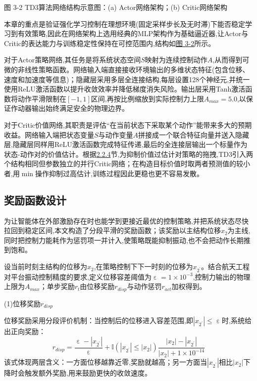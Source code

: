 \documentclass{scrbook}
\begin{document}
{{\par}{\centering 图 3-2 TD3算法网络结构示意图：(a) Actor网络架构；(b) Critic网络架构\label{ref-047}

\par}本章的重点是验证强化学习控制在理想环境(固定采样步长及无时滞)下能否稳定学习到有效策略,因此在网络架构上选用经典的MLP架构作为基础逼近器,让Actor与Critic的表达能力与训练稳定性保持在可控范围内,结构如{\hyperref[ref-047]{图 3-2}}所示。

对于Actor策略网络,其任务是将系统状态空间$S$映射为连续控制动作$A$,从而得到可微的非线性策略函数。网络输入端直接接收环境输出的多维状态特征(包含位移、速度和加速度等信息)；隐藏层采用多层全连接结构,每层设置128个神经元,并统一使用ReLU激活函数以提升收敛效率并降低梯度消失风险。输出层采用Tanh激活函数将动作平滑限制在$[-1,1]$区间,再按比例缩放到实际控制力上限$A_{max}=5.0$,以保证作动器输出始终满足安全的物理边界。

对于Critic价值网络,其职责是评估``在当前状态下采取某个动作''能带来多大的预期收益。网络输入端把状态变量$S$与动作变量$A$拼接成一个联合特征向量并送入隐藏层,隐藏层同样用ReLU激活函数完成特征传递,最后的全连接层输出一个标量作为状态-动作对的价值估计。根据{\hyperref[ref-033]{2.2.4}}节,为抑制价值过估计对策略的拖拽,TD3引入两个结构相同但参数独立的并行Critic网络；在构造目标价值时取两者预测值的较小者,用$\min $操作抑制过高估计,训练过程因此更稳也更不容易发散。

\subsection{\label{ref-048}奖励函数设计\label{mark-3.2.2}}

为让智能体在外部激励存在时也能学到更接近最优的控制策略,并把系统状态尽快拉回到稳定区间,本文构造了分段平滑的奖励函数；该奖励以主结构位移$x_{2}$为主线,同时把控制力能耗作为惩罚项一并计入,使策略既能抑制振动,也不会把动作长期推到饱和。

设当前时刻主结构的位移为$x_{2}$,在策略控制下下一时刻的位移为$x_{{2^{\prime}}}$。结合航天工程对平台振动控制精度的要求,定义位移容差阈值为$\upepsilon =1\times 10^{-3}$,控制力输出的物理上限为$A_{max}$；单步奖励$r_{t}$由位移奖励$r_{disp}$与动作惩罚$r_{act}$加权得到。

(1)位移奖励$r_{disp}$

位移奖励采用分段评价机制：当控制后的位移进入容差范围,即$| x_{{2^{\prime}}}| \leq \upepsilon $时,系统给出正向奖励：
\begin{equation}
\tag{3-6}
r_{disp}=\frac{\upepsilon -| x_{{2^{\prime}}}| }{\upepsilon }+\mathrm{\mathbb{I}}(| x_{{2^{\prime}}}| \leq | x_{2}| )\frac{| x_{2}| -| x_{{2^{\prime}}}| }{| x_{2}| +1\times 10^{-14}}
\end{equation}
该式体现两层含义：一方面位移越靠近零,奖励就越高；另一方面当$| x_{{2^{\prime}}}| $相比$| x_{2}| $下降时会触发额外奖励,用来鼓励更快的收敛速度。

}
\end{document}
